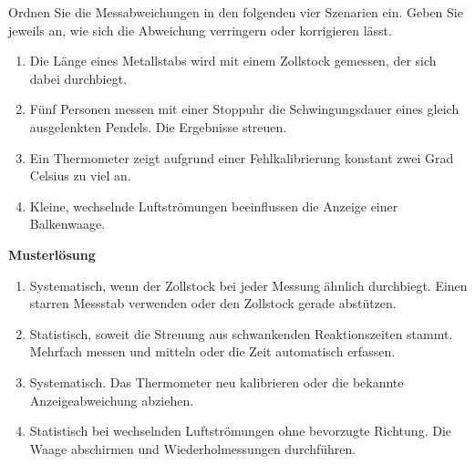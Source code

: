 \begin{ExerciseBlock}
Ordnen Sie die Messabweichungen in den folgenden vier Szenarien ein. Geben Sie jeweils an, wie sich die Abweichung verringern oder korrigieren lässt.
\begin{enumerate}
\item Die Länge eines Metallstabs wird mit einem Zollstock gemessen, der sich dabei durchbiegt.
\item Fünf Personen messen mit einer Stoppuhr die Schwingungsdauer eines gleich ausgelenkten Pendels. Die Ergebnisse streuen.
\item Ein Thermometer zeigt aufgrund einer Fehlkalibrierung konstant zwei Grad Celsius zu viel an.
\item Kleine, wechselnde Luftströmungen beeinflussen die Anzeige einer Balkenwaage.
\end{enumerate}
\end{ExerciseBlock}
\begin{Solution}
\par\medskip\noindent\textbf{Musterlösung}\par\nopagebreak[4]
\begin{enumerate}
\item Systematisch, wenn der Zollstock bei jeder Messung ähnlich durchbiegt. Einen starren Messstab verwenden oder den Zollstock gerade abstützen.
\item Statistisch, soweit die Streuung aus schwankenden Reaktionszeiten stammt. Mehrfach messen und mitteln oder die Zeit automatisch erfassen.
\item Systematisch. Das Thermometer neu kalibrieren oder die bekannte Anzeigeabweichung abziehen.
\item Statistisch bei wechselnden Luftströmungen ohne bevorzugte Richtung. Die Waage abschirmen und Wiederholmessungen durchführen.
\end{enumerate}
\end{Solution}
